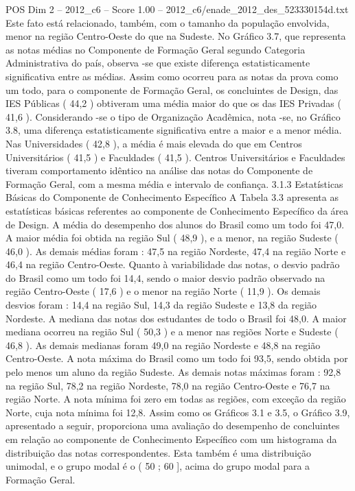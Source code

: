 \begin{textsample}{POS Dim 2 – 2012\_c6 – Score 1.00 – 2012\_c6/enade\_2012\_des\_523330154d.txt}
Este fato está relacionado, também, com o tamanho da população envolvida, menor na região Centro-Oeste do que na Sudeste.
No Gráfico 3.7, que representa as notas médias no Componente de Formação Geral segundo Categoria Administrativa do país, observa -se que existe diferença estatisticamente significativa entre as médias.
Assim como ocorreu para as notas da prova como um todo, para o componente de Formação Geral, os concluintes de Design, das IES Públicas ( 44,2 ) obtiveram uma média maior do que os das IES Privadas ( 41,6 ).
Considerando -se o tipo de Organização Acadêmica, nota -se, no Gráfico 3.8, uma diferença estatisticamente significativa entre a maior e a menor média.
Nas Universidades ( 42,8 ), a média é mais elevada do que em Centros Universitários ( 41,5 ) e Faculdades ( 41,5 ).
Centros Universitários e Faculdades tiveram comportamento idêntico na análise das notas do Componente de Formação Geral, com a mesma média e intervalo de confiança. 3.1.3 Estatísticas Básicas do Componente de Conhecimento Específico A Tabela 3.3 apresenta as estatísticas básicas referentes ao componente de Conhecimento Específico da área de Design.
A média do desempenho dos alunos do Brasil como um todo foi 47,0.
A maior média foi obtida na região Sul ( 48,9 ), e a menor, na região Sudeste ( 46,0 ).
As demais médias foram : 47,5 na região Nordeste, 47,4 na região Norte e 46,4 na região Centro-Oeste.
Quanto à variabilidade das notas, o desvio padrão do Brasil como um todo foi 14,4, sendo o maior desvio padrão observado na região Centro-Oeste ( 17,6 ) e o menor na região Norte ( 11,9 ).
Os demais desvios foram : 14,4 na região Sul, 14,3 da região Sudeste e 13,8 da região Nordeste.
A mediana das notas dos estudantes de todo o Brasil foi 48,0.
A maior mediana ocorreu na região Sul ( 50,3 ) e a menor nas regiões Norte e Sudeste ( 46,8 ).
As demais medianas foram 49,0 na região Nordeste e 48,8 na região Centro-Oeste.
A nota máxima do Brasil como um todo foi 93,5, sendo obtida por pelo menos um aluno da região Sudeste.
As demais notas máximas foram : 92,8 na região Sul, 78,2 na região Nordeste, 78,0 na região Centro-Oeste e 76,7 na região Norte.
A nota mínima foi zero em todas as regiões, com exceção da região Norte, cuja nota mínima foi 12,8.
Assim como os Gráficos 3.1 e 3.5, o Gráfico 3.9, apresentado a seguir, proporciona uma avaliação do desempenho de concluintes em relação ao componente de Conhecimento Específico com um histograma da distribuição das notas correspondentes.
Esta também é uma distribuição unimodal, e o grupo modal é o ( 50 ; 60 ], acima do grupo modal para a Formação Geral.

\end{textsample}
